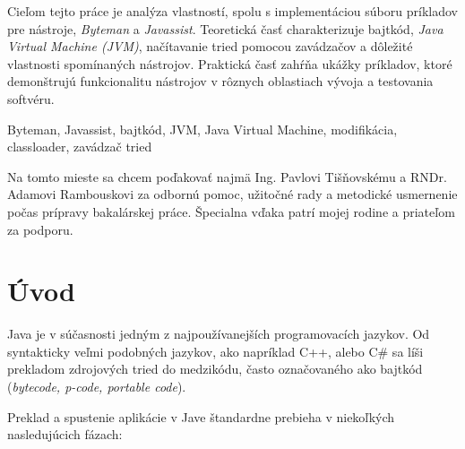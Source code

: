 \documentclass[11pt,final,oneside]{fithesis}
\begin{document}
\FrontMatter
\ThesisTitlePage

\begin{ThesisDeclaration}
\DeclarationText
\AdvisorName
\end{ThesisDeclaration}

\begin{ThesisAbstract}
Cieľom tejto práce je analýza vlastností, spolu s implementáciou súboru
príkladov pre nástroje, \textit{Byteman} a \textit{Javassist}. Teoretická časť 
charakterizuje bajtkód, \textit{Java Virtual Machine (JVM)}, načítavanie tried
pomocou zavádzačov a dôležité vlastnosti spomínaných nástrojov. Praktická časť 
zahŕňa ukážky príkladov, ktoré demonštrujú funkcionalitu nástrojov v rôznych 
oblastiach vývoja a testovania softvéru.
\end{ThesisAbstract}

\begin{ThesisKeyWords}
Byteman, Javassist, bajtkód, JVM, Java Virtual Machine, modifikácia, 
classloader, zavádzač tried
\end{ThesisKeyWords}

\begin{ThesisThanks}
Na tomto mieste sa chcem poďakovať najmä Ing. Pavlovi Tišňovskému a RNDr. 
Adamovi Rambouskovi za odbornú pomoc, užitočné rady a metodické usmernenie 
počas prípravy bakalárskej práce. Špecialna vďaka patrí mojej rodine a 
priateľom za podporu.
\end{ThesisThanks}

\MainMatter
\tableofcontents

\chapter{Úvod}

Java je v súčasnosti jedným z najpoužívanejších programovacích jazykov.
Od syntakticky veľmi podobných jazykov, ako napríklad C++, alebo
C\# sa líši prekladom zdrojových tried do medzikódu, často označovaného ako
bajtkód (\textit{bytecode, p-code, portable code}).

Preklad a spustenie aplikácie v Jave štandardne prebieha v niekoľkých
nasledujúcich fázach:
\end{document}
